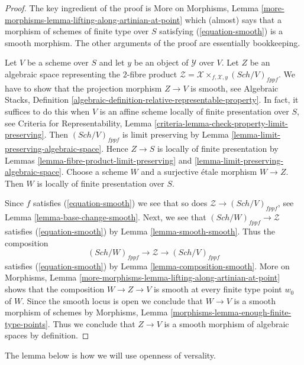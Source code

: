 \documentclass{stacks-project}
\theoremstyle{plain}
\theoremstyle{definition}
\theoremstyle{remark}
\numberwithin{equation}{subsection}
\def\Sch{\mathit{Sch}}
\begin{document}
\begin{proof}
The key ingredient of the proof is More on Morphisms, Lemma
\ref{more-morphisms-lemma-lifting-along-artinian-at-point}
which (almost) says that a morphism of schemes of finite type over $S$
satisfying (\ref{equation-smooth}) is a smooth morphism. The other
arguments of the proof are essentially bookkeeping.

\medskip\noindent
Let $V$ be a scheme over $S$ and let $y$ be an object of $\mathcal{Y}$ over
$V$. Let $Z$ be an algebraic space representing the $2$-fibre product
$\mathcal{Z} = \mathcal{X} \times_{f, \mathcal{X}, y} (\Sch/V)_{fppf}$.
We have to show that the projection morphism $Z \to V$ is smooth, see
Algebraic Stacks, Definition
\ref{algebraic-definition-relative-representable-property}.
In fact, it suffices to do this when $V$ is an affine scheme
locally of finite presentation over $S$, see
Criteria for Representability, Lemma
\ref{criteria-lemma-check-property-limit-preserving}.
Then $(\Sch/V)_{fppf}$ is limit preserving by
Lemma \ref{lemma-limit-preserving-algebraic-space}.
Hence $Z \to S$ is locally of finite presentation by
Lemmas \ref{lemma-fibre-product-limit-preserving} and
\ref{lemma-limit-preserving-algebraic-space}.
Choose a scheme $W$ and a surjective \'etale morphism $W \to Z$.
Then $W$ is locally of finite presentation over $S$.

\medskip\noindent
Since $f$ satisfies (\ref{equation-smooth}) we see that so does
$\mathcal{Z} \to (\Sch/V)_{fppf}$, see Lemma \ref{lemma-base-change-smooth}.
Next, we see that $(\Sch/W)_{fppf} \to \mathcal{Z}$ satisfies
(\ref{equation-smooth}) by Lemma \ref{lemma-smooth-smooth}.
Thus the composition
$$
(\Sch/W)_{fppf} \to \mathcal{Z} \to (\Sch/V)_{fppf}
$$
satisfies (\ref{equation-smooth}) by Lemma \ref{lemma-composition-smooth}.
More on Morphisms, Lemma
\ref{more-morphisms-lemma-lifting-along-artinian-at-point}
shows that the composition $W \to Z \to V$ is smooth at every finite type
point $w_0$ of $W$. Since the smooth locus is open we conclude
that $W \to V$ is a smooth morphism of schemes by
Morphisms, Lemma \ref{morphisms-lemma-enough-finite-type-points}.
Thus we conclude that $Z \to V$ is a smooth morphism
of algebraic spaces by definition.
\end{proof}

\noindent
The lemma below is how we will use openness of versality.
\end{document}
